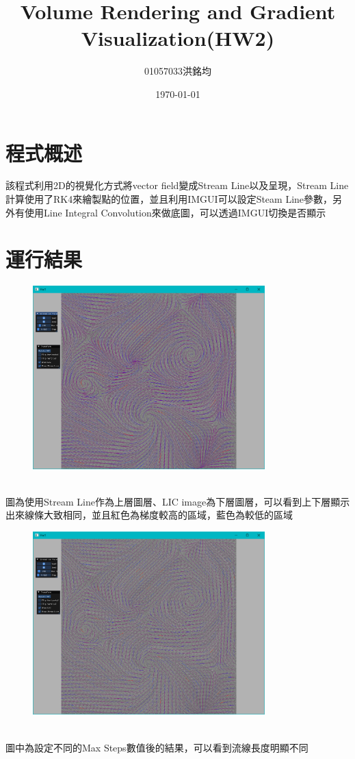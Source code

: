 \documentclass[a4paper,12pt]{article}
\title{Volume Rendering and Gradient Visualization(HW2)}
\author{01057033洪銘均}
\date{\today}
\begin{document}
\maketitle
\tableofcontents
\newpage

\section{程式概述}
該程式利用2D的視覺化方式將vector field變成Stream Line以及呈現，Stream Line計算使用了RK4來繪製點的位置，並且利用IMGUI可以設定Steam Line參數，另外有使用Line Integral Convolution來做底圖，可以透過IMGUI切換是否顯示


\section{運行結果}

\begin{figure}[H]
    \centering
    \includegraphics[width=0.8\textwidth]{img/img0.png}
\end{figure}\\
圖為使用Stream Line作為上層圖層、LIC image為下層圖層，可以看到上下層顯示出來線條大致相同，並且紅色為梯度較高的區域，藍色為較低的區域\\

\begin{figure}[H]
    \centering
    \includegraphics[width=0.8\textwidth]{img/img1.png}
\end{figure}\\
圖中為設定不同的Max Steps數值後的結果，可以看到流線長度明顯不同\\
\end{document}
